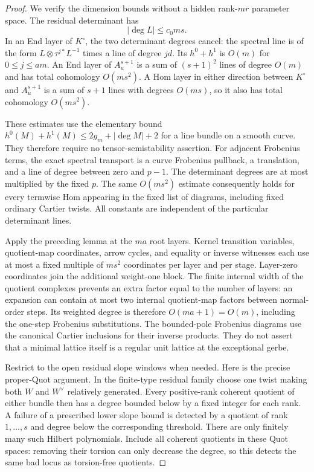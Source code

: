 \begin{proof}
We verify the dimension bounds without a hidden rank-$mr$
parameter space. The residual determinant has
\[
                         |\deg L|\leq c_0ms.            \tag{D.WF.9}
\]
In an End layer of $K^\circ$, the two determinant degrees
cancel: the spectral line is of the form
$L\otimes\tau^{j*}L^{-1}$ times a line of degree $jd$.
Its $h^0+h^1$ is $O(m)$ for $0\leq j\leq am$.
An End layer of $A_u^{s+1}$ is a sum of $(s+1)^2$ lines
of degree $O(m)$ and has total cohomology $O(ms^2)$.
A Hom layer in either direction between $K^\circ$ and
$A_u^{s+1}$ is a sum of $s+1$ lines with degrees $O(ms)$,
so it also has total cohomology $O(ms^2)$.

These estimates use the elementary bound
$h^0(M)+h^1(M)\leq 2g_m+|\deg M|+2$ for a line bundle on
a smooth curve. They therefore require no tensor-semistability
assertion. For adjacent Frobenius terms, the exact spectral
transport is a curve Frobenius pullback, a translation, and
a line of degree between zero and $p-1$. The determinant
degrees are at most multiplied by the fixed $p$.
The same $O(ms^2)$ estimate consequently holds for every
termwise Hom appearing in the fixed list of diagrams,
including fixed ordinary Cartier twists. All constants are
independent of the particular determinant lines.

Apply the preceding lemma at the $ma$ root layers. Kernel
transition variables, quotient-map coordinates, arrow cycles,
and equality or inverse witnesses each use at most a fixed
multiple of $ms^2$ coordinates per layer and per stage.
Layer-zero coordinates join the additional weight-one block.
The finite internal width of the quotient complexes prevents
an extra factor equal to the number of layers: an expansion
can contain at most two internal quotient-map factors between
normal-order steps. Its weighted degree is therefore
$O(ma+1)=O(m)$, including the one-step Frobenius substitutions.
The bounded-pole Frobenius diagrams use the canonical Cartier
inclusions for their inverse products. They do not assert
that a minimal lattice itself is a regular unit lattice at
the exceptional gerbe.

Restrict to the open residual slope windows when needed.
Here is the precise proper-Quot argument. In the finite-type
residual family choose one twist making both $W$ and $W^\vee$
relatively generated. Every positive-rank coherent quotient
of either bundle then has a degree bounded below by a fixed
integer for each rank. A failure of a prescribed lower
slope bound is detected by a quotient of rank $1,\ldots,s$
and degree below the corresponding threshold. There are
only finitely many such Hilbert polynomials. Include all
coherent quotients in these Quot spaces: removing their
torsion can only decrease the degree, so this detects the
same bad locus as torsion-free quotients.


\end{proof}
